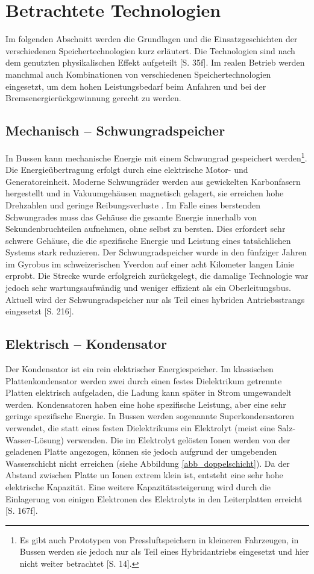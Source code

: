 \section{Betrachtete Technologien}
Im folgenden Abschnitt werden die Grundlagen und die Einsatzgeschichten der verschiedenen Speichertechnologien kurz erläutert. Die Technologien sind nach dem genutzten physikalischen Effekt aufgeteilt \cite{Sterner:2014}[S. 35f]. Im realen Betrieb werden manchmal auch Kombinationen von verschiedenen Speichertechnologien eingesetzt, um dem hohen Leistungsbedarf beim Anfahren und bei der Bremsenergierückgewinnung gerecht zu werden.

\subsection{Mechanisch – Schwungradspeicher}
In Bussen kann mechanische Energie mit einem Schwungrad gespeichert werden\footnote{Es gibt auch Prototypen von Pressluftspeichern in kleineren Fahrzeugen, in Bussen werden sie jedoch nur als Teil eines Hybridantriebs eingesetzt und hier nicht weiter betrachtet \cite{Sebastian-Naumann:2014}[S. 14].}. Die Energieübertragung erfolgt durch eine elektrische Motor- und Generatoreinheit. Moderne Schwungräder werden aus gewickelten Karbonfasern hergestellt und in Vakuumgehäusen magnetisch gelagert, sie erreichen hohe Drehzahlen und geringe Reibungsverluste \cite{993788}. Im Falle eines berstenden Schwungrades muss das Gehäuse die gesamte Energie innerhalb von Sekundenbruchteilen aufnehmen, ohne selbst zu bersten. Dies erfordert sehr schwere Gehäuse, die die spezifische Energie und Leistung eines tatsächlichen Systems stark reduzieren. Der Schwungradspeicher wurde in den fünfziger Jahren im Gyrobus im schweizerischen Yverdon auf einer acht Kilometer langen Linie erprobt. Die Strecke wurde erfolgreich zurückgelegt, die damalige Technologie war jedoch sehr wartungsaufwändig und weniger effizient als ein Oberleitungsbus. Aktuell wird der Schwungradspeicher nur als Teil eines hybriden Antriebsstrangs eingesetzt \cite{tub_aleph001746639}[S. 216].

\subsection{Elektrisch – Kondensator}
Der Kondensator ist ein rein elektrischer Energiespeicher. Im klassischen Plattenkondensator werden zwei durch einen festes Dielektrikum getrennte Platten elektrisch aufgeladen, die Ladung kann später in Strom umgewandelt werden. Kondensatoren haben eine hohe spezifische Leistung, aber eine sehr geringe spezifische Energie. In Bussen werden sogenannte Superkondensatoren verwendet, die statt eines festen Dielektrikums ein Elektrolyt (meist eine Salz-Wasser-Lösung) verwenden. Die im Elektrolyt gelösten Ionen werden von der geladenen Platte angezogen, können sie jedoch aufgrund der umgebenden Wasserschicht nicht erreichen (siehe Abbildung \ref{abb_doppelschicht}). Da der Abstand zwischen Platte un Ionen extrem klein ist, entsteht eine sehr hohe elektrische Kapazität. Eine weitere Kapazitätssteigerung wird durch die Einlagerung von einigen Elektronen des Elektrolyts in den Leiterplatten erreicht \cite{Sterner:2014}[S. 167f].

